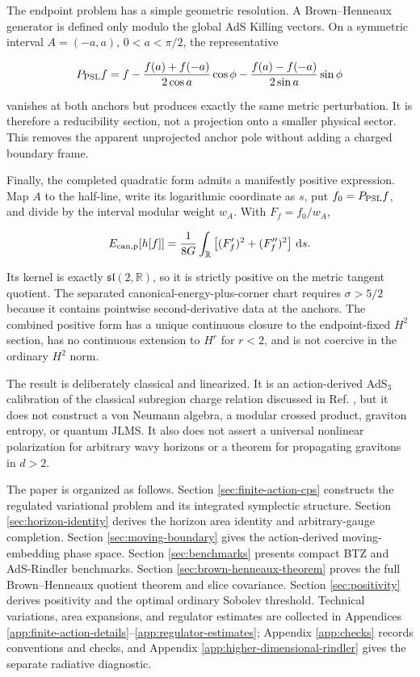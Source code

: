 The endpoint problem has a simple geometric resolution. A Brown--Henneaux generator is defined only modulo the global AdS Killing vectors. On a symmetric interval $A=(-a,a)$, $0<a<\pi/2$, the representative

\begin{align}
P_{\rm PSL}f
=f-\frac{f(a)+f(-a)}{2\cos a}\cos\phi
-\frac{f(a)-f(-a)}{2\sin a}\sin\phi \label{eq:intro-psl}
\end{align}

vanishes at both anchors but produces exactly the same metric perturbation. It is therefore a reducibility section, not a projection onto a smaller physical sector. This removes the apparent unprojected anchor pole without adding a charged boundary frame.

Finally, the completed quadratic form admits a manifestly positive expression. Map $A$ to the half-line, write its logarithmic coordinate as $s$, put $f_0=P_{\rm PSL}f$, and divide by the interval modular weight $w_A$. With $F_f=f_0/w_A$,

\begin{align}
E_{{\rm can,p}}[h[f]]
=\frac1{8G}\int_{\mathbb R}
\left[(F_f')^2+(F_f'')^2\right]\,\mathrm ds .
\end{align}

Its kernel is exactly $\mathfrak{sl}(2,\mathbb R)$, so it is strictly positive on the metric tangent quotient. The separated canonical-energy-plus-corner chart requires $\sigma>5/2$ because it contains pointwise second-derivative data at the anchors. The combined positive form has a unique continuous closure to the endpoint-fixed $H^2$ section, has no continuous extension to $H^r$ for $r<2$, and is not coercive in the ordinary $H^2$ norm.

The result is deliberately classical and linearized. It is an action-derived AdS$_3$ calibration of the classical subregion charge relation discussed in Ref. \cite{ColinEllerin:2025gravitons}, but it does not construct a von Neumann algebra, a modular crossed product, graviton entropy, or quantum JLMS. It also does not assert a universal nonlinear polarization for arbitrary wavy horizons or a theorem for propagating gravitons in $d>2$.

The paper is organized as follows. Section \ref{sec:finite-action-cps} constructs the regulated variational problem and its integrated symplectic structure. Section \ref{sec:horizon-identity} derives the horizon area identity and arbitrary-gauge completion. Section \ref{sec:moving-boundary} gives the action-derived moving-embedding phase space. Section \ref{sec:benchmarks} presents compact BTZ and AdS-Rindler benchmarks. Section \ref{sec:brown-henneaux-theorem} proves the full Brown--Henneaux quotient theorem and slice covariance. Section \ref{sec:positivity} derives positivity and the optimal ordinary Sobolev threshold. Technical variations, area expansions, and regulator estimates are collected in Appendices \ref{app:finite-action-details}--\ref{app:regulator-estimates}; Appendix \ref{app:checks} records conventions and checks, and Appendix \ref{app:higher-dimensional-rindler} gives the separate radiative diagnostic.
